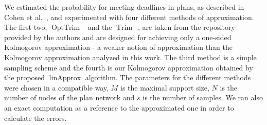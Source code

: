 \documentclass[letterpaper]{article} %
\DeclareMathOperator{\Trim}{Trim}
\DeclareMathOperator{\KlmApprox}{linApprox}
\DeclareMathOperator{\OptTrim}{OptTrim}
\begin{document}


We estimated the probability for meeting deadlines in plans, as described in Cohen et al.~, and experimented with four different methods of approximation. The first two, $\OptTrim$~\cite{CohenGW18} and the $\Trim$~\cite{cohen2015estimating}, are taken from the repository provided by the authors and are designed for achieving only a one-sided Kolmogorov approximation - a  weaker notion of approximation than the Kolmogorov approximation analyzed in this work. The third method is a simple sampling scheme and the fourth is our Kolmogorov approximation obtained by the proposed $\KlmApprox$ algorithm. The parameters for the different methods were chosen in a compatible way, $M$ is the maximal support size, $N$ is the number of nodes of the plan network and $s$ is the number of samples. We ran also an exact computation as a reference to the approximated one in order to calculate the errors. 
\end{document}
